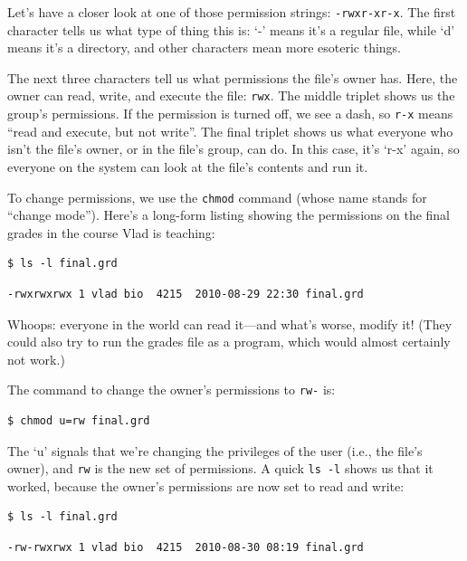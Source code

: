 \documentclass[]{book}
\begin{document}
Let's have a closer look at one of those permission strings:
\texttt{-rwxr-xr-x}. The first character tells us what type of thing
this is: `-' means it's a regular file, while `d' means it's a
directory, and other characters mean more esoteric things.

The next three characters tell us what permissions the file's owner has.
Here, the owner can read, write, and execute the file: \texttt{rwx}. The
middle triplet shows us the group's permissions. If the permission is
turned off, we see a dash, so \texttt{r-x} means ``read and execute, but
not write''. The final triplet shows us what everyone who isn't the
file's owner, or in the file's group, can do. In this case, it's `r-x'
again, so everyone on the system can look at the file's contents and run
it.

To change permissions, we use the \texttt{chmod} command (whose name
stands for ``change mode''). Here's a long-form listing showing the
permissions on the final grades in the course Vlad is teaching:

\begin{verbatim}
$ ls -l final.grd
\end{verbatim}

\begin{verbatim}
-rwxrwxrwx 1 vlad bio  4215  2010-08-29 22:30 final.grd
\end{verbatim}

Whoops: everyone in the world can read it---and what's worse, modify it!
(They could also try to run the grades file as a program, which would
almost certainly not work.)

The command to change the owner's permissions to \texttt{rw-} is:

\begin{verbatim}
$ chmod u=rw final.grd
\end{verbatim}

The `u' signals that we're changing the privileges of the user (i.e.,
the file's owner), and \texttt{rw} is the new set of permissions. A
quick \texttt{ls -l} shows us that it worked, because the owner's
permissions are now set to read and write:

\begin{verbatim}
$ ls -l final.grd
\end{verbatim}

\begin{verbatim}
-rw-rwxrwx 1 vlad bio  4215  2010-08-30 08:19 final.grd
\end{verbatim}
\end{document}
